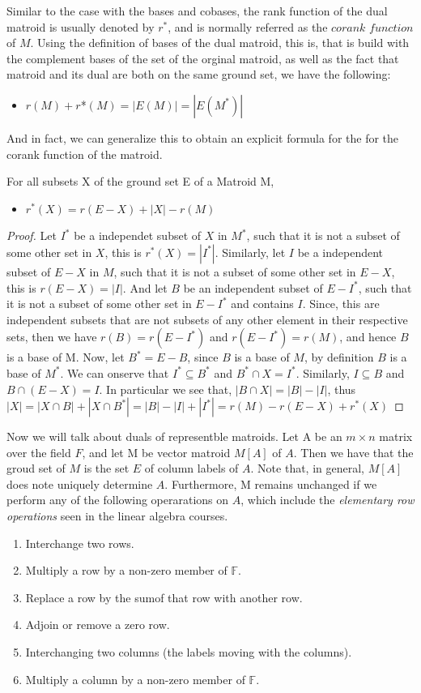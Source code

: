 Similar to the case with the bases and cobases, the rank function of the dual matroid is usually denoted by $r^*$, and is normally referred as the $corank$ $function$ of $M$. Using the definition of bases of the dual matroid, this is, that is build with the complement bases of the set of the orginal matroid, as well as the fact that matroid and its dual are both on the same ground set, we have the following:

\begin{itemize}
    \item $r(M) + r$*$(M) = |E(M)|=|E(M^*)|$
\end{itemize}

And in fact, we can generalize this to obtain an explicit formula for the for the corank function of the matroid. 

For all subsets X of the ground set E of a Matroid M,
\begin{itemize}
    \item $r^*(X)=r(E-X)+|X|-r(M)$
\end{itemize}

\begin{proof}
    Let $I^*$ be a independet subset of $X$ in $M^*$, such that it is not a subset of some other set in $X$, this is $r^*(X)=|I^*|$. Similarly, let $I$ be a independent subset of $E-X$ in $M$, such that it is not a subset of some other set in $E-X$, this is $r(E-X)=|I|$. And let $B$ be an independent subset of $E-I^*$, such that it is not a subset of some other set in $E-I^*$ and contains $I$. Since, this are independent subsets that are not subsets of any other element in their respective sets, then we have $r(B)=r(E-I^*)$ and $r(E-I^*)=r(M)$, and hence $B$ is a base of M.
    Now, let $B^*=E-B$, since $B$ is a base of $M$, by definition $B$ is a base of $M^*$. We can onserve that $I^*\subseteq B^*$ and  $B^*\cap X=I^*$. Similarly, $I\subseteq B$ and  $B\cap (E-X)=I$. In particular we see that, $|B\cap X|=|B|-|I|$, thus
    $|X|=|X\cap B|+|X\cap B^*|=|B|-|I|+|I^*|=r(M)-r(E-X)+r^*(X)$
\end{proof}


Now we will talk about duals of representble matroids.
Let A be an $m \times n$ matrix over the field $F$, and let M be vector matroid $M[A]$ of $A$. Then we have that the groud set of $M$ is the set $E$ of column labels of $A$. Note that, in general, $M[A]$ does note uniquely determine $A$. Furthermore, M remains unchanged if we perform any of the following operarations on $A$, which include the \textit{elementary row operations} seen in the linear algebra courses.
\begin{enumerate}
    \item Interchange two rows.
    \item Multiply a row by a non-zero member of $\mathbb{F}$.
    \item Replace a row by the sumof that row with another row.
    \item Adjoin or remove a zero row.
    \item Interchanging two columns (the labels moving with the columns).
    \item Multiply a column by a non-zero member of $\mathbb{F}$.
\end{enumerate}

